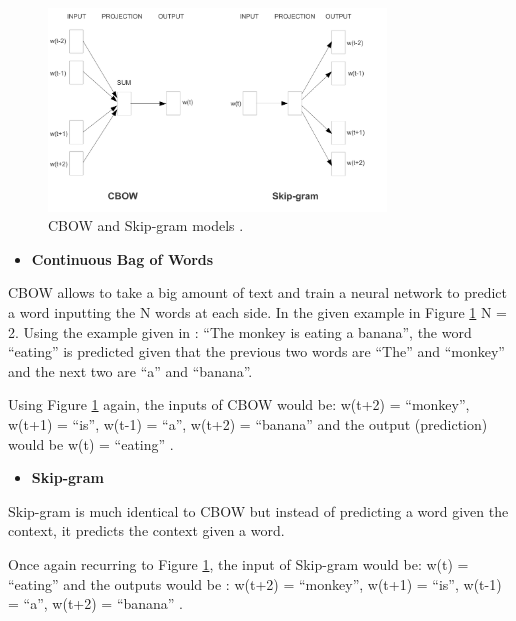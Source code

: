         \begin{figure}[H]
            \centering
            \captionsetup{justification=centering}
            \includegraphics[width=0.8\textwidth]{Sections/3StateOfTheArt/3_images/Cbow_Skip.png}
            \caption[CBOW and Skip-gram models]{CBOW and Skip-gram models \cite{Mikolov2013}.} 
            \label{fig:cbow_skip}
        \end{figure}



        \begin{itemize}
            \item \textbf{Continuous Bag of Words}
        \end{itemize}


       CBOW allows to take a big amount of text and train a neural network to predict a word inputting the N words at each side. In the given example in Figure \ref{fig:cbow_skip}  N = 2. Using the example given in \cite{Mordecki2017} : “The monkey is eating a banana”, the word “eating” is predicted given that the previous two words are “The” and “monkey” and the next two are “a” and “banana”.

        Using Figure \ref{fig:cbow_skip} again, the inputs of CBOW would be: w(t+2) = “monkey”, w(t+1) = “is”, w(t-1) = “a”, w(t+2) = “banana” and the output (prediction) would be w(t) = “eating” \cite{Mordecki2017}.
        
        
        \begin{itemize}
            \item \textbf{Skip-gram}
        \end{itemize}

        Skip-gram is much identical to CBOW but instead of predicting a word given the context, it predicts the context given a word. 

        Once again recurring to Figure \ref{fig:cbow_skip}, the input of Skip-gram would be: w(t) = “eating” and the outputs would be : w(t+2) = “monkey”, w(t+1) = “is”, w(t-1) = “a”, w(t+2) = “banana” \cite{Mordecki2017}.


